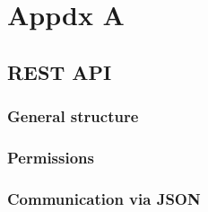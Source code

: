 \chapter{Appdx A}

\section{REST API}
\subsection{General structure}

\subsection{Permissions}

\subsection{Communication via JSON}


